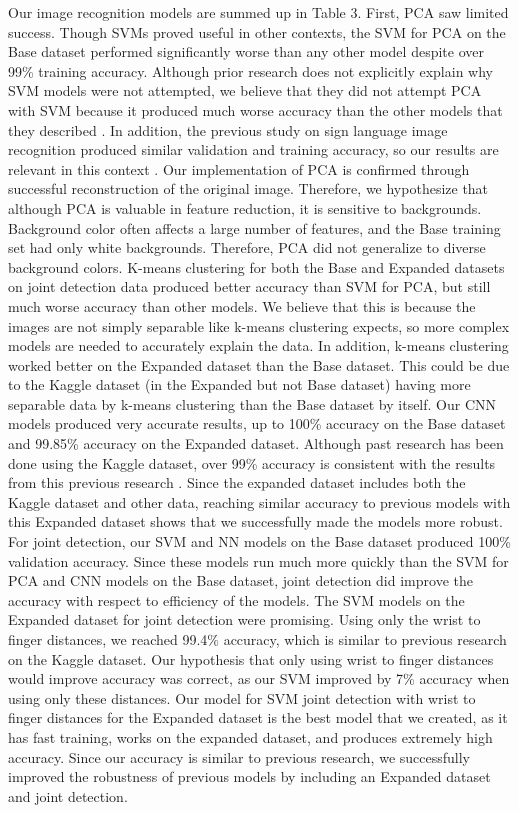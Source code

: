 \documentclass{article}
\begin{document}
Our image recognition models are summed up in Table 3. First, PCA saw limited success. Though SVMs proved useful in other contexts, the SVM for PCA on the Base dataset performed significantly worse than any other model despite over 99\% training accuracy. Although prior research does not explicitly explain why SVM models were not attempted, we believe that they did not attempt PCA with SVM because it produced much worse accuracy than the other models that they described \cite{CNNM} \cite{Ahmed2023RockPaperScissorsIC}. In addition, the previous study on sign language image recognition produced similar validation and training accuracy, so our results are relevant in this context \cite{Chowdary2023SignLR}. Our implementation of PCA is confirmed through successful reconstruction of the original image. Therefore, we hypothesize that although PCA is valuable in feature reduction, it is sensitive to backgrounds. Background color often affects a large number of features, and the Base training set had only white backgrounds. Therefore, PCA did not generalize to diverse background colors.
K-means clustering for both the Base and Expanded datasets on joint detection data produced better accuracy than SVM for PCA, but still much worse accuracy than other models. We believe that this is because the images are not simply separable like k-means clustering expects, so more complex models are needed to accurately explain the data. In addition, k-means clustering worked better on the Expanded dataset than the Base dataset. This could be due to the Kaggle dataset (in the Expanded but not Base dataset) having more separable data by k-means clustering than the Base dataset by itself.
Our CNN models produced very accurate results, up to 100\% accuracy on the Base dataset and 99.85\% accuracy on the Expanded dataset. Although past research has been done using the Kaggle dataset, over 99\% accuracy is consistent with the results from this previous research \cite{CNNM} \cite{Ahmed2023RockPaperScissorsIC}. Since the expanded dataset includes both the Kaggle dataset and other data, reaching similar accuracy to previous models with this Expanded dataset shows that we successfully made the models more robust.
For joint detection, our SVM and NN models on the Base dataset produced 100\% validation accuracy. Since these models run much more quickly than the SVM for PCA and CNN models on the Base dataset, joint detection did improve the accuracy with respect to efficiency of the models.
The SVM models on the Expanded dataset for joint detection were promising. Using only the wrist to finger distances, we reached 99.4\% accuracy, which is similar to previous research on the Kaggle dataset. Our hypothesis that only using wrist to finger distances would improve accuracy was correct, as our SVM improved by 7\% accuracy when using only these distances. Our model for SVM joint detection with wrist to finger distances for the Expanded dataset is the best model that we created, as it has fast training, works on the expanded dataset, and produces extremely high accuracy. Since our accuracy is similar to previous research, we successfully improved the robustness of previous models by including an Expanded dataset and joint detection.
\end{document}
